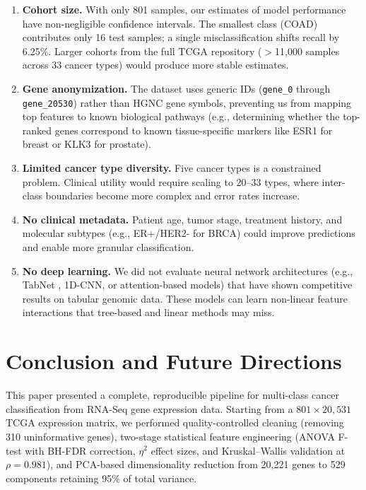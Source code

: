 \documentclass{article}
\begin{document}
\begin{enumerate}[leftmargin=2em]
\item \textbf{Cohort size.} With only 801 samples, our estimates of model performance have non-negligible confidence intervals. The smallest class (COAD) contributes only 16 test samples; a single misclassification shifts recall by 6.25\%. Larger cohorts from the full TCGA repository ($>$11{,}000 samples across 33 cancer types) would produce more stable estimates.

\item \textbf{Gene anonymization.} The dataset uses generic IDs (\texttt{gene\_0} through \texttt{gene\_20530}) rather than HGNC gene symbols, preventing us from mapping top features to known biological pathways (e.g., determining whether the top-ranked genes correspond to known tissue-specific markers like ESR1 for breast or KLK3 for prostate).

\item \textbf{Limited cancer type diversity.} Five cancer types is a constrained problem. Clinical utility would require scaling to 20--33 types, where inter-class boundaries become more complex and error rates increase.

\item \textbf{No clinical metadata.} Patient age, tumor stage, treatment history, and molecular subtypes (e.g., ER+/HER2- for BRCA) could improve predictions and enable more granular classification.

\item \textbf{No deep learning.} We did not evaluate neural network architectures (e.g., TabNet \citep{arik2021tabnet}, 1D-CNN, or attention-based models) that have shown competitive results on tabular genomic data. These models can learn non-linear feature interactions that tree-based and linear methods may miss.
\end{enumerate}

\section{Conclusion and Future Directions}
This paper presented a complete, reproducible pipeline for multi-class cancer classification from RNA-Seq gene expression data. Starting from a $801 \times 20{,}531$ TCGA expression matrix, we performed quality-controlled cleaning (removing 310 uninformative genes), two-stage statistical feature engineering (ANOVA F-test with BH-FDR correction, $\eta^2$ effect sizes, and Kruskal--Wallis validation at $\rho = 0.981$), and PCA-based dimensionality reduction from 20{,}221 genes to 529 components retaining 95\% of total variance.
\end{document}
